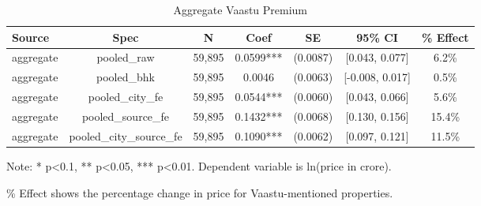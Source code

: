 \begin{table}[htbp]
\centering
\caption{Aggregate Vaastu Premium}
\begin{tabular}{lcccccc}
\toprule
Source & Spec & N & Coef & SE & 95\% CI & \% Effect \\
\midrule
aggregate & pooled_raw & 59,895 & 0.0599*** & (0.0087) & [0.043, 0.077] & 6.2\% \\
aggregate & pooled_bhk & 59,895 & 0.0046 & (0.0063) & [-0.008, 0.017] & 0.5\% \\
aggregate & pooled_city_fe & 59,895 & 0.0544*** & (0.0060) & [0.043, 0.066] & 5.6\% \\
aggregate & pooled_source_fe & 59,895 & 0.1432*** & (0.0068) & [0.130, 0.156] & 15.4\% \\
aggregate & pooled_city_source_fe & 59,895 & 0.1090*** & (0.0062) & [0.097, 0.121] & 11.5\% \\
\bottomrule
\end{tabular}
\begin{tablenotes}
\small
\item Note: * p<0.1, ** p<0.05, *** p<0.01. Dependent variable is ln(price in crore).
\item \% Effect shows the percentage change in price for Vaastu-mentioned properties.
\end{tablenotes}
\end{table}